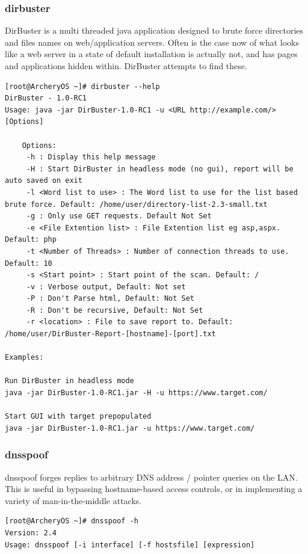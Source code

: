 \documentclass{article}
\begin{document}
\subsubsection{dirbuster}
DirBuster is a multi threaded java application designed to brute force directories and files names on web/application servers. Often is the case now of what looks like a web server in a state of default installation is actually not, and has pages and applications hidden within. DirBuster attempts to find these. 
\begin{lstlisting}
[root@ArcheryOS ~]# dirbuster --help
DirBuster - 1.0-RC1
Usage: java -jar DirBuster-1.0-RC1 -u <URL http://example.com/> [Options]

	Options:
	 -h : Display this help message
	 -H : Start DirBuster in headless mode (no gui), report will be auto saved on exit
	 -l <Word list to use> : The Word list to use for the list based brute force. Default: /home/user/directory-list-2.3-small.txt
	 -g : Only use GET requests. Default Not Set
	 -e <File Extention list> : File Extention list eg asp,aspx. Default: php
	 -t <Number of Threads> : Number of connection threads to use. Default: 10
	 -s <Start point> : Start point of the scan. Default: /
	 -v : Verbose output, Default: Not set
	 -P : Don't Parse html, Default: Not Set
	 -R : Don't be recursive, Default: Not Set
	 -r <location> : File to save report to. Default: /home/user/DirBuster-Report-[hostname]-[port].txt

Examples:

Run DirBuster in headless mode
java -jar DirBuster-1.0-RC1.jar -H -u https://www.target.com/

Start GUI with target prepopulated
java -jar DirBuster-1.0-RC1.jar -u https://www.target.com/
\end{lstlisting}

\subsubsection{dnsspoof}
dnsspoof  forges  replies to arbitrary DNS address / pointer queries on the LAN. This is useful in bypassing hostname-based access controls, or in implementing a variety of man-in-the-middle attacks.
\begin{lstlisting}
[root@ArcheryOS ~]# dnsspoof -h
Version: 2.4
Usage: dnsspoof [-i interface] [-f hostsfile] [expression]
\end{lstlisting}
\end{document}
